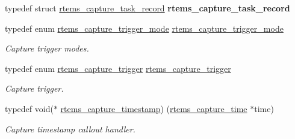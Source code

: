 \begin{DoxyCompactItemize}
\mbox{\label{group__libmisc__capture_gaedce7efb3f172cf368715207fd0e1147}} 
typedef struct \mbox{\hyperlink{structrtems__capture__task__record}{rtems\+\_\+capture\+\_\+task\+\_\+record}} {\bfseries rtems\+\_\+capture\+\_\+task\+\_\+record}
\item 
typedef enum \mbox{\hyperlink{group__libmisc__capture_ga56557affa8f3021c9d5ed6ebca98f473}{rtems\+\_\+capture\+\_\+trigger\+\_\+mode}} \mbox{\hyperlink{group__libmisc__capture_gadc87e3aa33443ac0b7fb2f3083129eed}{rtems\+\_\+capture\+\_\+trigger\+\_\+mode}}
\begin{DoxyCompactList}\small\item\em Capture trigger modes. \end{DoxyCompactList}\item 
typedef enum \mbox{\hyperlink{group__libmisc__capture_ga5fd896f3981ec7db204355a0e527a074}{rtems\+\_\+capture\+\_\+trigger}} \mbox{\hyperlink{group__libmisc__capture_ga12806ba988f2cb7373e289941bedafbf}{rtems\+\_\+capture\+\_\+trigger}}
\begin{DoxyCompactList}\small\item\em Capture trigger. \end{DoxyCompactList}\item 
typedef void($\ast$ \mbox{\hyperlink{group__libmisc__capture_gab70845b819ef4c8c57f4f46ce276f0dd}{rtems\+\_\+capture\+\_\+timestamp}}) (\mbox{\hyperlink{group__libmisc__capture_gaf4cab587ea286bb2352fcfab9c223560}{rtems\+\_\+capture\+\_\+time}} $\ast$time)
\begin{DoxyCompactList}\small\item\em Capture timestamp callout handler. \end{DoxyCompactList}\end{DoxyCompactItemize}
